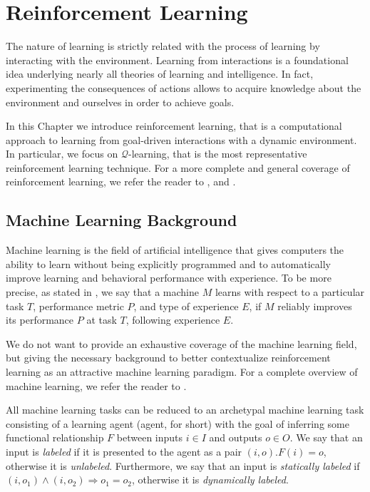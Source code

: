 \chapter{Reinforcement Learning}
\label{chp:reinforcement-learning}


The nature of learning is strictly related with the process of learning by interacting with the environment.
Learning from interactions is a foundational idea underlying nearly all theories of learning and intelligence.
In fact, experimenting the consequences of actions allows to acquire knowledge about the environment and ourselves in order to achieve goals.

In this Chapter we introduce reinforcement learning, that is a computational approach to learning from goal-driven interactions with a dynamic environment.
%
In particular, we focus on $\mathcal{Q}$-learning, that is the most representative reinforcement learning technique.
%
For a more complete and general coverage of reinforcement learning, we refer the reader to \cite{sutton1998reinforcement}, \cite{szepesvari2010algorithms} and \cite{kaelbling1996reinforcement}.


\section{Machine Learning Background}
\label{sec:reinforcement-learning-machine-learning-background}

Machine learning is the field of artificial intelligence that gives computers the ability to learn without being explicitly programmed and to automatically improve learning and behavioral performance with experience.
%
To be more precise, as stated in \cite{mitchell2006discipline}, we say that a machine $M$ learns with respect to a particular task $T$, performance metric $P$, and type of experience $E$, if $M$ reliably improves its performance $P$ at task $T$, following experience $E$.

We do not want to provide an exhaustive coverage of the machine learning field, but giving the necessary background to better contextualize reinforcement learning as an attractive machine learning paradigm.
%
For a complete overview of machine learning, we refer the reader to \cite{samuel2000some}.

All machine learning tasks can be reduced to an archetypal machine learning task consisting of a learning agent (agent, for short) with the goal of inferring some functional relationship $F$ between inputs $i\in I$ and outputs $o\in O$.
%
We say that an input is \textit{labeled} if it is presented to the agent as a pair $(i,o).F(i)=o$, otherwise it is \textit{unlabeled}.
Furthermore, we say that an input is \textit{statically labeled} if $(i,o_{1}) \wedge (i,o_{2}) \Rightarrow o_{1}=o_{2}$, otherwise it is \textit{dynamically labeled}.

